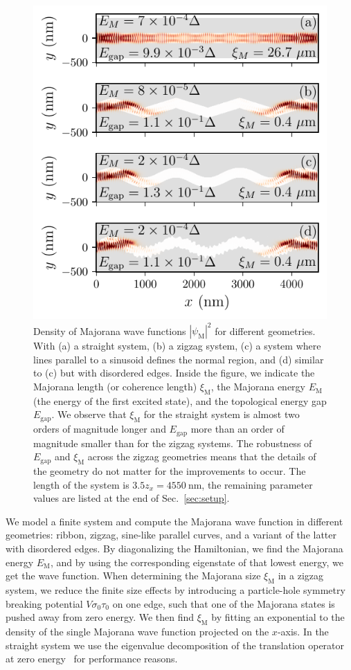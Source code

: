 \begin{figure}
\begin{center}
\includegraphics[width=0.6\columnwidth]{chapter_zigzag/figures/wavefunctions}
\caption{Density of Majorana wave functions $\left| \psi_\textrm{M} \right|^2$ for different geometries.
With (a) a straight system, (b) a zigzag system, (c) a system where lines parallel to a sinusoid defines the normal region, and (d) similar to (c) but with disordered edges.
Inside the figure, we indicate the Majorana length (or coherence length) $\xi_\textrm{M}$, the Majorana energy $E_\textrm{M}$ (the energy of the first excited state), and the topological energy gap $E_\textrm{gap}$.
We observe that $\xi_\textrm{M}$ for the straight system is almost two orders of magnitude longer and $E_\textrm{gap}$ more than an order of magnitude smaller than for the zigzag systems.
The robustness of $E_\textrm{gap}$ and $\xi_\textrm{M}$ across the zigzag geometries means that the details of the geometry do not matter for the improvements to occur.
The length of the system is $3.5 z_x=\SI{4550}{\nm}$, the remaining parameter values are listed at the end of Sec.~\ref{sec:setup}.\label{fig:wave_functions}}
\end{center}
\end{figure}

We model a finite system and compute the Majorana wave function in different geometries: ribbon, zigzag, sine-like parallel curves, and a variant of the latter with disordered edges.
By diagonalizing the Hamiltonian, we find the Majorana energy $E_\textrm{M}$, and by using the corresponding eigenstate of that lowest energy, we get the wave function.
When determining the Majorana size $\xi_\textrm{M}$ in a zigzag system, we reduce the finite size effects by introducing a particle-hole symmetry breaking potential $V \sigma_0 \tau_0$ on one edge, such that one of the Majorana states is pushed away from zero energy.
We then find $\xi_\textrm{M}$ by fitting an exponential to the density of the single Majorana wave function projected on the $x$-axis.
In the straight system we use the eigenvalue decomposition of the translation operator at zero energy~\cite{Nijholt2016} for performance reasons.

